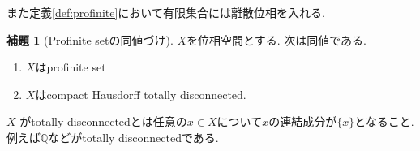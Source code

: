 \documentclass[dvipdfmx,a4paper,11pt]{article}
\newcommand{\Q}{\mathbb{Q}}
\theoremstyle{definition}
\newtheorem{lem}[thm]{補題}
\begin{document}
また定義\ref{def:profinite}において有限集合には離散位相を入れる. 

\begin{tcolorbox}
 [colback = white, colframe = green!35!black, fonttitle = \bfseries,breakable = true]
\begin{lem}[Profinite setの同値づけ] \cite[5.22.2]{Sta}
$X$を位相空間とする. 
次は同値である.
\begin{enumerate}
\item $X$はprofinite set
\item $X$はcompact Hausdorff totally disconnected.
\end{enumerate}
   \end{lem}
 \end{tcolorbox}
$X$ がtotally disconnectedとは任意の$x \in X$について$x$の連結成分が$\{ x\}$となること.
例えば$\Q$などがtotally disconnectedである.
\end{document}
